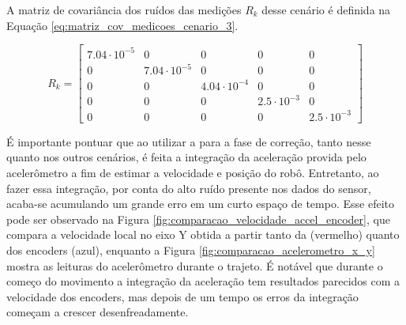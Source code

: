 \documentclass[acronym, symbols, table, deposito]{fei}
\begin{document}
			A matriz de covariância dos ruídos das medições $R_{k}$ desse cenário é definida na Equação \eqref{eq:matriz_cov_medicoes_cenario_3}.
			
			\begin{equation}\label{eq:matriz_cov_medicoes_cenario_3}
				R_{k} = \begin{bmatrix}
					7.04\cdot10^{-5} & 0 & 0 & 0 & 0 \\
					0 & 7.04\cdot10^{-5} & 0 & 0 & 0 \\
					0 & 0 & 4.04\cdot10^{-4} & 0 & 0 \\
					0 & 0 & 0 & 2.5\cdot10^{-3} & 0 \\
					0 & 0 & 0 & 0 & 2.5\cdot10^{-3}
				\end{bmatrix}
			\end{equation}
		
			É importante pontuar que ao utilizar a  para a fase de correção, tanto nesse quanto nos outros cenários, é feita a integração da aceleração provida pelo acelerômetro a fim de estimar a velocidade e posição do robô. Entretanto, ao fazer essa integração, por conta do alto ruído presente nos dados do sensor, acaba-se acumulando um grande erro em um curto espaço de tempo. Esse efeito pode ser observado na Figura \ref{fig:comparacao_velocidade_accel_encoder}, que compara a velocidade local no eixo Y obtida a partir tanto da  (vermelho) quanto dos encoders (azul), enquanto a Figura \ref{fig:comparacao_acelerometro_x_y} mostra as leituras do acelerômetro durante o trajeto. É notável que durante o começo do movimento a integração da aceleração tem resultados parecidos com a velocidade dos encoders, mas depois de um tempo os erros da integração começam a crescer desenfreadamente.
			
\end{document}
